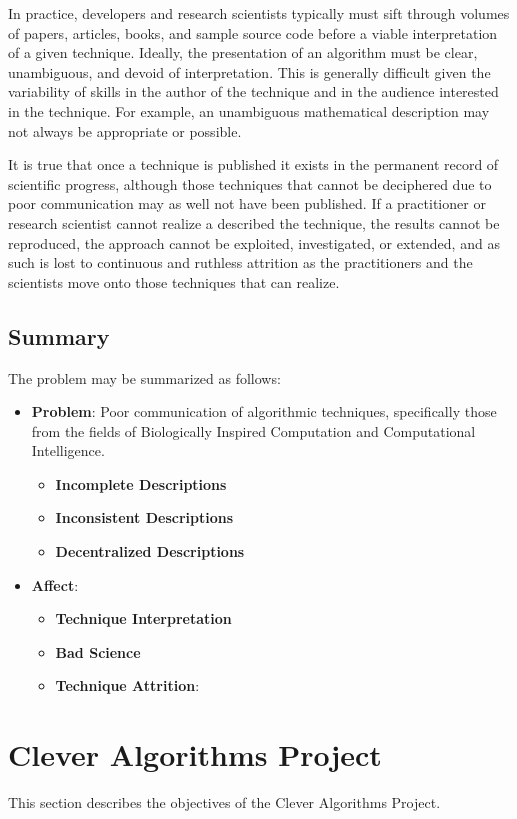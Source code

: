 \documentclass[a4paper, 11pt]{article}
\begin{document}
In practice, developers and research scientists typically must sift through volumes of papers, articles, books, and sample source code before a viable interpretation of a given technique. Ideally, the presentation of an algorithm must be clear, unambiguous, and devoid of interpretation. This is generally difficult given the variability of skills in the author of the technique and in the audience interested in the technique. For example, an unambiguous mathematical description may not always be appropriate or possible.

It is true that once a technique is published it exists in the permanent record of scientific progress, although those techniques that cannot be deciphered due to poor communication may as well not have been published. If a practitioner or research scientist cannot realize a described the technique, the results cannot be reproduced, the approach cannot be exploited, investigated, or extended, and as such is lost to continuous and ruthless attrition as the practitioners and the scientists move onto those techniques that can realize.

\subsection{Summary}
The problem may be summarized as follows:
\begin{itemize}
	\item \textbf{Problem}: Poor communication of algorithmic techniques, specifically those from the fields of Biologically Inspired Computation and Computational Intelligence.
	\begin{itemize}
		\item \textbf{Incomplete Descriptions}
		\item \textbf{Inconsistent Descriptions}
		\item \textbf{Decentralized Descriptions}
	\end{itemize}
	\item \textbf{Affect}: 
	\begin{itemize}
		\item \textbf{Technique Interpretation}
		\item \textbf{Bad Science}		
		\item \textbf{Technique Attrition}: 
	\end{itemize}
\end{itemize}

\section{Clever Algorithms Project}
This section describes the objectives of the Clever Algorithms Project.
\end{document}
